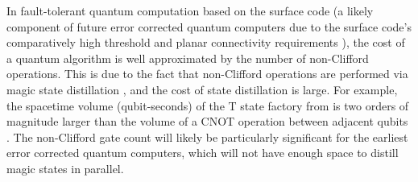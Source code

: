 \documentclass[twocolumn,accepted=2019-03-30]{quantumarticle}
\begin{document}
In fault-tolerant quantum computation based on the surface code (a likely component of future error corrected quantum computers due to the surface code's comparatively high threshold and planar connectivity requirements \cite{Brav98,Denn02,Raus07,Raus07d,Fowl12f}), the cost of a quantum algorithm is well approximated by the number of non-Clifford operations.
This is due to the fact that non-Clifford operations are performed via magic state distillation \cite{bravyi2005}, and the cost of state distillation is large.
For example, the spacetime volume (qubit-seconds) of the T state factory from \cite{fowler2018} is two orders of magnitude larger than the volume of a CNOT operation between adjacent qubits \cite{horsman2012}.
The non-Clifford gate count will likely be particularly significant for the earliest error corrected quantum computers, which will not have enough space to distill magic states in parallel.
\end{document}
